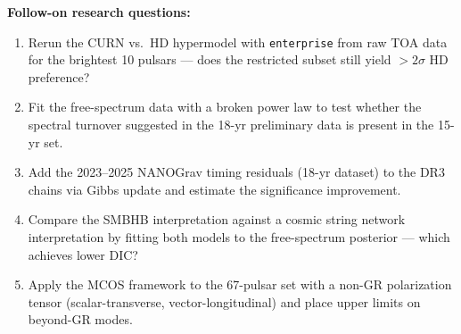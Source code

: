 \noindent\textbf{Follow-on research questions:}
\begin{enumerate}[leftmargin=1.6em,itemsep=0.2em,topsep=0.2em,label=Q\arabic*.]
\item Rerun the CURN vs.\ HD hypermodel with \texttt{enterprise} from raw TOA data for the brightest 10 pulsars --- does the restricted subset still yield $>2\sigma$ HD preference?
\item Fit the free-spectrum data with a broken power law to test whether the spectral turnover suggested in the 18-yr preliminary data is present in the 15-yr set.
\item Add the 2023--2025 NANOGrav timing residuals (18-yr dataset) to the DR3 chains via Gibbs update and estimate the significance improvement.
\item Compare the SMBHB interpretation against a cosmic string network interpretation by fitting both models to the free-spectrum posterior --- which achieves lower DIC?
\item Apply the MCOS framework to the 67-pulsar set with a non-GR polarization tensor (scalar-transverse, vector-longitudinal) and place upper limits on beyond-GR modes.
\end{enumerate}

